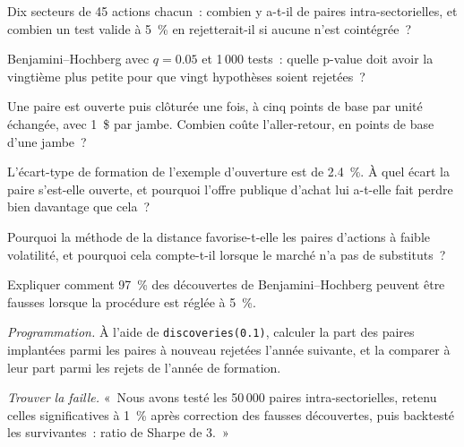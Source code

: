 \begin{exercise}[$\star$]\label{exo:s1:pairs-and-baskets:1}
Dix secteurs de 45 actions chacun~: combien y a-t-il de paires intra-sectorielles, et combien un test valide à 5~\% en rejetterait-il si aucune n'est cointégrée~?
\end{exercise}

\begin{exercise}[$\star$]\label{exo:s1:pairs-and-baskets:2}
Benjamini--Hochberg avec $q = 0.05$ et 1\,000 tests~: quelle p-value doit avoir la vingtième plus petite pour que vingt hypothèses soient rejetées~?
\end{exercise}

\begin{exercise}[$\star$]\label{exo:s1:pairs-and-baskets:3}
Une paire est ouverte puis clôturée une fois, à cinq points de base par unité échangée, avec 1~\$ par jambe. Combien coûte l'aller-retour, en points de base d'une jambe~?
\end{exercise}

\begin{exercise}[$\star\star$]\label{exo:s1:pairs-and-baskets:4}
L'écart-type de formation de l'exemple d'ouverture est de 2.4~\%. À quel écart la paire s'est-elle ouverte, et pourquoi l'offre publique d'achat lui a-t-elle fait perdre bien davantage que cela~?
\end{exercise}

\begin{exercise}[$\star\star$]\label{exo:s1:pairs-and-baskets:5}
Pourquoi la méthode de la distance favorise-t-elle les paires d'actions à faible volatilité, et pourquoi cela compte-t-il lorsque le marché n'a pas de substituts~?
\end{exercise}

\begin{exercise}[$\star\star$]\label{exo:s1:pairs-and-baskets:6}
Expliquer comment 97~\% des découvertes de Benjamini--Hochberg peuvent être fausses lorsque la procédure est réglée à 5~\%.
\end{exercise}

\begin{exercise}[$\star\star\star$]\label{exo:s1:pairs-and-baskets:7}
\emph{Programmation.} À l'aide de \texttt{discoveries(0.1)}, calculer la part des paires implantées parmi les paires à nouveau rejetées l'année suivante, et la comparer
à leur part parmi les rejets de l'année de formation.
\end{exercise}

\begin{exercise}[$\star\star\star$]\label{exo:s1:pairs-and-baskets:8}
\emph{Trouver la faille.} «~Nous avons testé les 50\,000 paires intra-sectorielles, retenu celles significatives à 1~\% après correction des fausses découvertes, puis backtesté les
survivantes~: ratio de Sharpe de 3.~»
\end{exercise}

